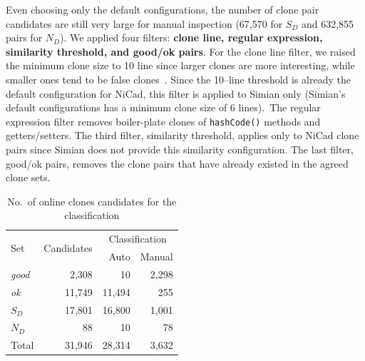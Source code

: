 \documentclass[sigconf,review, anonymous]{acmart}
\begin{document}
Even choosing only the default configurations, the number of clone pair candidates are still very large for manual inspection (67,570 for $S_D$ and 632,855 pairs for $N_D$). We applied four filters: \textbf{clone line, regular expression, similarity threshold, and good/ok pairs}. For the clone line filter, we raised the minimum clone size to 10 line since larger clones are more interesting, while smaller ones tend to be false clones~\cite{Saini2016}. Since the 10--line threshold is already the default configuration for NiCad, this filter is applied to Simian only (Simian's default configurations has a minimum clone size of 6 lines).~The regular expression filter removes boiler-plate clones of \verb|hashCode()| methods and getters/setters. The third filter, similarity threshold, applies only to NiCad clone pairs since Simian does not provide this similarity configuration. The last filter, good/ok pairs, removes the clone pairs that have already existed in the agreed clone sets. 

\begin{table}
	\centering
	\caption{No.~of online clones candidates for the classification}
	\label{tab:online_clone_classification_results}
	\small
	\begin{tabular}{l|r|r|r}
		\hline
		\multirow{2}{*}{Set} & \multirow{2}{*}{Candidates} & \multicolumn{2}{c}{Classification} \\ \cline{3-4}
		& & Auto & Manual \\
		\hline 
		\multirow{1}{*}{\textit{good}} & 2,308 & 10 & 2,298 \\
		\multirow{1}{*}{\textit{ok}} & 11,749 & 11,494 & 255 \\
		\multirow{1}{*}{$S_D$} & 17,801 & 16,800 & 1,001 \\
		\multirow{1}{*}{$N_D$} & 88 & 10 & 78 \\ 
		\hline
		Total  & 31,946 & 28,314 & 3,632 \\ 
		\hline
	\end{tabular} %
\end{table}
\end{document}
